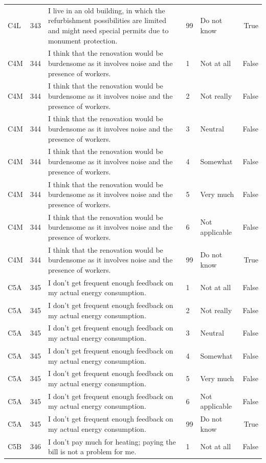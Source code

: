 \begin{tabular}{lrlllr}
C4L & 343 & I live in an old building, in which the refurbishment possibilities are limited and might need special permits due to monument protection. & 99 & Do not know & True \\
C4M & 344 & I think that the renovation would be burdensome as it involves noise and the presence of workers. & 1 & Not at all & False \\
C4M & 344 & I think that the renovation would be burdensome as it involves noise and the presence of workers. & 2 & Not really & False \\
C4M & 344 & I think that the renovation would be burdensome as it involves noise and the presence of workers. & 3 & Neutral & False \\
C4M & 344 & I think that the renovation would be burdensome as it involves noise and the presence of workers. & 4 & Somewhat & False \\
C4M & 344 & I think that the renovation would be burdensome as it involves noise and the presence of workers. & 5 & Very much & False \\
C4M & 344 & I think that the renovation would be burdensome as it involves noise and the presence of workers. & 6 & Not applicable & False \\
C4M & 344 & I think that the renovation would be burdensome as it involves noise and the presence of workers. & 99 & Do not know & True \\
C5A & 345 &  I don’t get frequent enough feedback on my actual energy consumption. & 1 & Not at all & False \\
C5A & 345 &  I don’t get frequent enough feedback on my actual energy consumption. & 2 & Not really & False \\
C5A & 345 &  I don’t get frequent enough feedback on my actual energy consumption. & 3 & Neutral & False \\
C5A & 345 &  I don’t get frequent enough feedback on my actual energy consumption. & 4 & Somewhat & False \\
C5A & 345 &  I don’t get frequent enough feedback on my actual energy consumption. & 5 & Very much & False \\
C5A & 345 &  I don’t get frequent enough feedback on my actual energy consumption. & 6 & Not applicable & False \\
C5A & 345 &  I don’t get frequent enough feedback on my actual energy consumption. & 99 & Do not know & True \\
C5B & 346 & I don’t pay much for heating; paying the bill is not a problem for me. & 1 & Not at all & False \\

\end{tabular}
